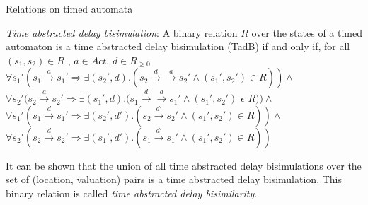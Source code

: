 \documentclass{beamer}
\begin{document}
\begin{frame}{Relations on timed automata}
\begin{definition} \label{def:tadb} \emph{Time abstracted delay bisimulation}: A binary relation
  $R$ over the states of a timed automaton is a time abstracted delay
  bisimulation (TadB) if and only if, for all
  $(s_1, s_2) \in R$ , $a \in Act$, $d \in R_{\ge 0}$\\
  $\forall s_1' (s_1 \xrightarrow{a} s_1' \Rightarrow \exists (s_2', d)
  . (s_2 \xrightarrow{d} \xrightarrow{a} s_2' \wedge (s_1', s_2') \in R ) )
  \wedge $ \\
  $\forall s_2' (s_2 \xrightarrow{a} s_2' \Rightarrow \exists (s_1', d)
  . (s_1 \xrightarrow{d} \xrightarrow{a} s_1' \wedge (s_1', s_2')$
  $\epsilon$ $R ) ) 
  \wedge $ \\
  $\forall s_1' (s_1 \xrightarrow{d} s_1' \Rightarrow \exists (s_2',
  d')
  . (s_2 \xrightarrow{d'} s_2' \wedge (s_1', s_2') \in R ) )
  \wedge $ \\
  $\forall s_2' (s_2 \xrightarrow{d} s_2' \Rightarrow \exists (s_1', d')
  . (s_1 \xrightarrow{d'} s_1' \wedge (s_1', s_2') \in R ) ) $ \\
\end{definition}

It can be shown that the
  union of all time abstracted delay bisimulations over the set of
  (location, valuation) pairs is a time abstracted delay
  bisimulation. This binary relation is called \textit{time abstracted
    delay bisimilarity}.
\end{frame}
\end{document}
